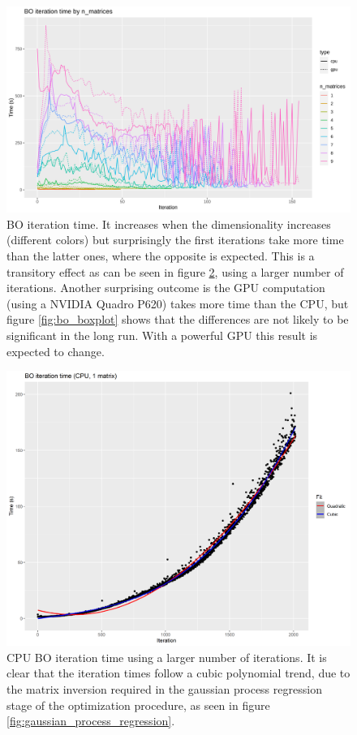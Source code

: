 \begin{figure}[h!]
	\centering
	\includegraphics[width=\textwidth]{figures/bo_time}
	\decoRule
	\caption[BO iteration time]{BO iteration time. It increases when the dimensionality increases (different colors) but surprisingly the first iterations take more time than the latter ones, where the opposite is expected. This is a transitory effect as can be seen in figure \ref{fig:bo_time_cpu_long}, using a larger number of iterations. Another surprising outcome is the GPU computation (using a NVIDIA Quadro P620) takes more time than the CPU, but figure \ref{fig:bo_boxplot} shows that the differences are not likely to be significant in the long run. With a powerful GPU this result is expected to change.}
	\label{fig:bo_time}
\end{figure}

\begin{figure}[h!]
\centering
\includegraphics[width=\textwidth]{figures/bo_time_cpu_long}
\decoRule
\caption[CPU BO iteration time (2)]{CPU BO iteration time using a larger number of iterations. It is clear that the iteration times follow a cubic polynomial trend, due to the matrix inversion required in the gaussian process regression stage of the optimization procedure, as seen in figure \ref{fig:gaussian_process_regression}.}
\label{fig:bo_time_cpu_long}
\end{figure}

